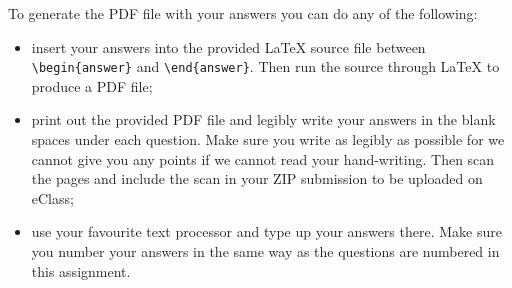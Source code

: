 \documentclass{article}
\begin{document}
To generate the PDF file with your answers you can do any of the following:

\begin{itemize}
\item
insert your answers into the provided \LaTeX{} source file between \verb|\begin{answer}| and \verb|\end{answer}|. Then run the source through \LaTeX{} to produce a PDF file;

\item print out the provided PDF file and legibly write your answers in the blank spaces under each question. Make sure you write as legibly as possible for we cannot give you any points if we cannot read your hand-writing. Then scan the pages and include the scan in your ZIP submission to be uploaded on eClass;

\item use your favourite text processor and type up your answers there. Make sure you number your answers in the same way as the questions are numbered in this assignment.
\end{itemize}
\end{document}
